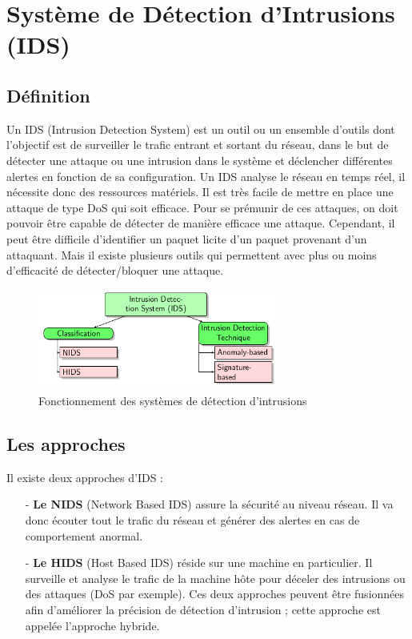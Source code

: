 \section{Système de Détection d’Intrusions (IDS)}

\subsection{Définition}

Un IDS (Intrusion Detection System) est un outil ou un ensemble d’outils dont l’objectif est de surveiller le trafic entrant et sortant du réseau, dans le but de détecter une attaque ou une intrusion dans le système et déclencher différentes alertes en fonction de sa configuration. Un IDS analyse le réseau en temps réel, il nécessite donc des ressources matériels.
Il est très facile de mettre en place une attaque de type DoS qui soit efficace. Pour se prémunir de ces attaques, on doit pouvoir être capable de détecter de manière efficace une attaque. Cependant, il peut être difficile d’identifier un paquet licite d’un paquet provenant d’un attaquant. Mais il existe plusieurs outils qui permettent avec plus ou moins d’efficacité de détecter/bloquer une attaque.

\begin{figure}[h]
\centering
\includegraphics[width=0.7\textwidth]{Figures/IDS}
\decoRule
\caption{Fonctionnement des systèmes de détection d’intrusions}
\label{fig:IDS_Architecture}
\end{figure} 

\subsection{Les approches}
\label{approchesIDS}
Il existe deux approches d’IDS :\\
\begin{itemize}
\item[-]\textbf{Le NIDS} (Network Based IDS) assure la sécurité au niveau réseau. Il va donc écouter tout le trafic du réseau et générer des alertes en cas de comportement anormal.\\
\item[-]\textbf{Le HIDS} (Host Based IDS) réside sur une machine en particulier. Il surveille et analyse le trafic de la machine hôte pour déceler des intrusions ou des attaques (DoS par exemple). 
Ces deux approches peuvent être fusionnées afin d’améliorer la précision de détection d’intrusion ; cette approche est appelée l’approche hybride.
\end{itemize}

